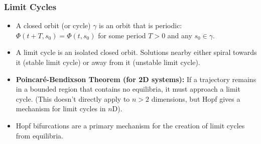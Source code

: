 \documentclass[aspectratio=169]{beamer}
\begin{document}
\begin{frame}{\insertsectionhead}
	\frametitle{Limit Cycles}
	\begin{itemize}
		\item A \alert{closed orbit (or cycle)} $\gamma$ is an orbit that is periodic: $\Phi(t+T, s_0) = \Phi(t, s_0)$ for some period $T>0$ and any $s_0 \in \gamma$.
		\item A \alert{limit cycle} is an isolated closed orbit. Solutions nearby either spiral towards it (stable limit cycle) or away from it (unstable limit cycle).
		\item \textbf{Poincaré-Bendixson Theorem (for 2D systems):} If a trajectory remains in a bounded region that contains no equilibria, it must approach a limit cycle. (This doesn't directly apply to $n>2$ dimensions, but Hopf gives a mechanism for limit cycles in $n$D).
		\item Hopf bifurcations are a primary mechanism for the creation of limit cycles from equilibria.
	\end{itemize}
\end{frame}
\end{document}
